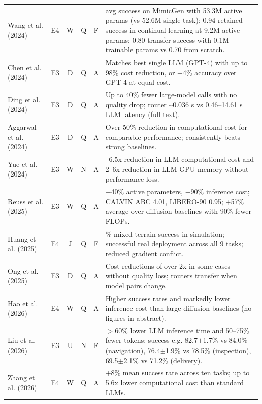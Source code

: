 \documentclass[10pt,a4paper]{article}
\begin{document}
\begin{longtable}{@{}>{\raggedright\arraybackslash}p{4.0cm}cccc>{\raggedright\arraybackslash}p{7.6cm}@{}}
Wang et al. (2024)~\cite{Wang2024b} & E4 & W & Q & F & 0.76 avg success on MimicGen with 53.3M active params (vs 52.6M single-task); 0.94 retained success in continual learning at 9.2M active params; 0.80 transfer success with 0.1M trainable params vs 0.70 from scratch. \\
Chen et al. (2024)~\cite{Chen2024} & E3 & D & Q & A & Matches best single LLM (GPT-4) with up to 98\% cost reduction, or +4\% accuracy over GPT-4 at equal cost. \\
Ding et al. (2024)~\cite{Ding2024} & E3 & D & Q & A & Up to 40\% fewer large-model calls with no quality drop; router \textasciitilde{}0.036 s vs 0.46--14.61 s LLM latency (full text). \\
Aggarwal et al. (2024)~\cite{Aggarwal2024} & E3 & D & Q & A & Over 50\% reduction in computational cost for comparable performance; consistently beats strong baselines. \\
Yue et al. (2024)~\cite{Yue2024} & E3 & W & N & A & 5.2--6.5x reduction in LLM computational cost and 2--6x reduction in LLM GPU memory without performance loss. \\
Reuss et al. (2025)~\cite{Reuss2025} & E3 & W & Q & A & $-$40\% active parameters, $-$90\% inference cost; CALVIN ABC 4.01, LIBERO-90 0.95; +57\% average over diffusion baselines with 90\% fewer FLOPs. \\
Huang et al. (2025)~\cite{Huang2025} & E4 & J & Q & F & 87.9\% mixed-terrain success in simulation; successful real deployment across all 9 tasks; reduced gradient conflict. \\
Ong et al. (2025)~\cite{Ong2025} & E3 & D & Q & A & Cost reductions of over 2x in some cases without quality loss; routers transfer when model pairs change. \\
Hao et al. (2026)~\cite{SMP2026} & E4 & W & Q & A & Higher success rates and markedly lower inference cost than large diffusion baselines (no figures in abstract). \\
Liu et al. (2026)~\cite{Liu2026} & E3 & U & N & F & $>$60\% lower LLM inference time and 50--75\% fewer tokens; success e.g. 82.7$\pm$1.7\% vs 84.0\% (navigation), 76.4$\pm$1.9\% vs 78.5\% (inspection), 69.5$\pm$2.1\% vs 71.2\% (delivery). \\
Zhang et al. (2026)~\cite{Zhang2026b} & E4 & W & Q & A & +8\% mean success rate across ten tasks; up to 5.6x lower computational cost than standard LLMs. \\
\bottomrule\end{longtable}
\end{document}
